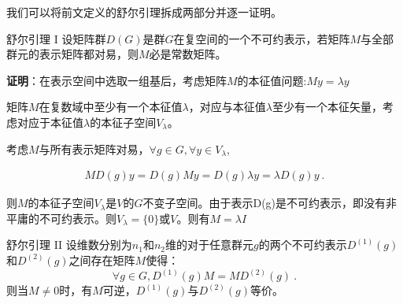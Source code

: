 我们可以将前文定义的舒尔引理拆成两部分并逐一证明。

\begin{lemma}{舒尔引理 I}
设矩阵群$D(G)$是群$G$在复空间的一个不可约表示，若矩阵$M$与全部群元的表示矩阵都对易，则$M$必是常数矩阵。
\end{lemma}

\textbf{证明}：在表示空间中选取一组基后，考虑矩阵$M$的本征值问题:$My=\lambda y$

矩阵$M$在复数域中至少有一个本征值$\lambda$，对应与本征值$\lambda$至少有一个本征矢量，考虑对应于本征值$\lambda$的本征子空间$V_\lambda$。

考虑$M$与所有表示矩阵对易，$\forall g\in G,\forall y\in V_\lambda$,

\begin{align}
 MD(g)y=D(g)My=D(g)\lambda y=\lambda D(g)y~.
\end{align}

则$M$的本征子空间$V_\lambda$是$V$的$G$不变子空间。由于表示D(g)是不可约表示，即没有非平庸的不可约表示。则$V_\lambda=\{0\}$或$V$。则有$M=\lambda I$

\begin{lemma}{舒尔引理 II}
设维数分别为$n_1$和$n_2$维的对于任意群元$g$的两个不可约表示$D^{(1)}(g)$和$D^{(2)}(g)$之间存在矩阵$M$使得：
\begin{equation}
\forall g\in G,D^{(1)}(g)M=MD^{(2)}(g)~.
\end{equation}
则当$M\neq 0$时，有$M$可逆，$D^{(1)}(g)$与$D^{(2)}(g)$等价。
\end{lemma}


